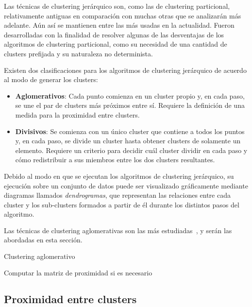 Las técnicas de clustering jerárquico son, como las de clustering particional, relativamente antiguas en comparación con muchas otras que se analizarán más adelante.
Aún así se mantienen entre las más usadas en la actualidad.
Fueron desarrolladas con la finalidad de resolver algunas de las desventajas de los algoritmos de clustering particional, como su necesidad de una cantidad de clusters prefijada y su naturaleza no determinista.

Existen dos clasificaciones para los algoritmos de clustering jerárquico de acuerdo al modo de generar los clusters:

\begin{itemize}
    \item \textbf{Aglomerativos}: Cada punto comienza en un cluster propio y, en cada paso, se une el par de clusters más próximos entre sí.
    Requiere la definición de una medida para la proximidad entre clusters.
    \item \textbf{Divisivos}: Se comienza con un único cluster que contiene a todos los puntos y, en cada paso, se divide un cluster hasta obtener clusters de solamente un elemento.
    Requiere un criterio para decidir cuál cluster dividir en cada paso y cómo redistribuir a sus miembros entre los dos clusters resultantes.
\end{itemize}

Debido al modo en que se ejecutan los algoritmos de clustering jerárquico, su ejecución sobre un conjunto de datos puede ser visualizado gráficamente mediante diagramas llamados \textit{dendrogramas}, que representan las relaciones entre cada cluster y los sub-clusters formados a partir de él durante los distintos pasos del algoritmo.

Las técnicas de clustering aglomerativas son las más estudiadas~\cite{Tan05}, y serán las abordadas en esta sección.

\begin{algorithm}
    \caption{Clustering aglomerativo}
    \label{algorithm:clusteringAglomerativo}
    Computar la matriz de proximidad si es necesario\;
\end{algorithm}

\subsection{Proximidad entre clusters}\label{subsec:proximidadEntreClusters}

